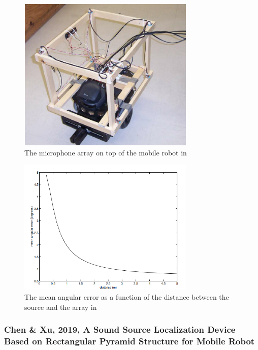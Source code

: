 \documentclass[notitlepage]{report}
\begin{document}
\begin{figure}[H]
\includegraphics[width=0.75\textwidth]{./valin_2003/robot.png}
\centering
\caption{The microphone array on top of the mobile robot in \cite{valin_robust_2003}}
\label{fig:valin_2003_robot}
\centering
\end{figure}

\begin{figure}[H]
\includegraphics[width=0.75\textwidth]{./valin_2003/plot.png}
\centering
\caption{The mean angular error as a function of the distance between the source and the array in \cite{valin_robust_2003}}
\label{fig:valin_2003_plot}
\centering
\end{figure}

\subsubsection{Chen \& Xu, 2019, A Sound Source Localization Device Based on Rectangular Pyramid Structure for Mobile Robot}
\end{document}
